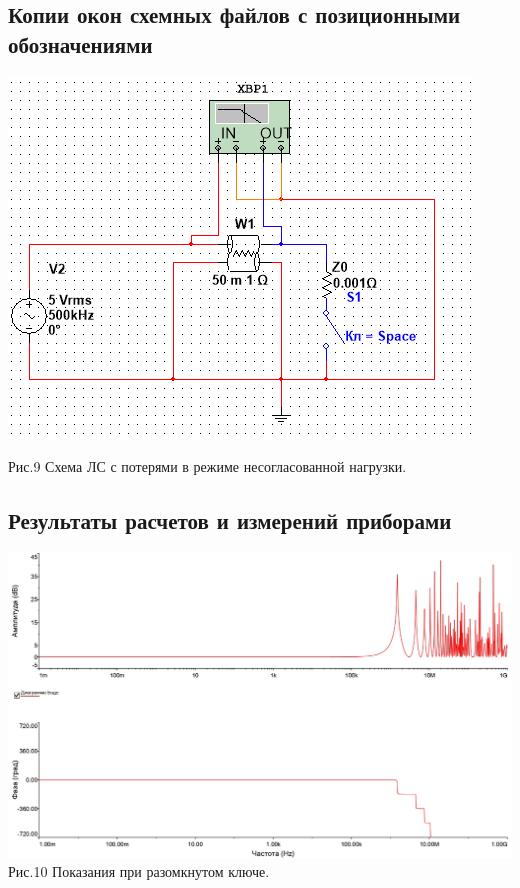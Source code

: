 \documentclass[11pt]{article}
\begin{document}
\subsection{Копии окон схемных файлов с позиционными обозначениями}
\includegraphics[width=1\linewidth]{img/fourth.png}
\begin{center}
    Рис.9 Схема ЛС с потерями в режиме несогласованной нагрузки.
\end{center}

\subsection{Результаты расчетов и измерений приборами}
\begin{center}
    \includegraphics[width=1\linewidth]{img/fourth1.png}
        Рис.10 Показания при разомкнутом ключе.
\end{center}
\end{document}
